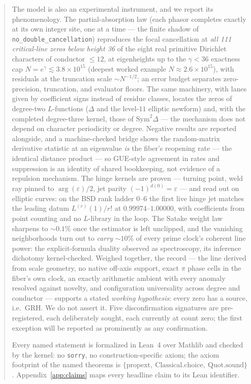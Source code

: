 \documentclass[11pt]{article}
\newcommand{\code}[1]{\texttt{#1}}
\begin{document}
\begin{abstract}
The model is also an experimental instrument, and we report its phenomenology.  The partial-absorption
law (each phasor completes exactly at its own integer site, one at a time --- the finite shadow of
\code{no\_double\_cancellation}) reproduces the focal cancellation at \emph{all 111 critical-line
zeros below height 36} of the eight real primitive Dirichlet characters of conductor $\le 12$, at
eigenheights up to the $\gamma<36$ exactness cap $N=e^{\gamma}\lesssim3.8\times10^{15}$ (deepest
worked example $N\approx2.6\times10^{15}$), with residuals at the truncation scale
$\sim N^{-1/2}$; an error budget separates zero-precision, truncation, and evaluator floors.  The
same machinery, with lanes given by coefficient signs instead of residue classes, locates the zeros
of degree-two $L$-functions ($\Delta$ and the level-$11$ elliptic newform) and, with the completed
degree-three kernel, those of $\mathrm{Sym}^2\Delta$ --- the mechanism does not
depend on character periodicity or degree.  Negative results are reported alongside, and a machine-checked bridge shows the random-matrix
derivative statistic at an eigenvalue \emph{is} the fiber's reopening rate --- the identical
distance product --- so GUE-style agreement in rates and suppression is an identity of shared
bookkeeping, not evidence of a repulsion mechanism.  The hinge kernels are proven --- turning
point, weld ray pinned to $\arg(\varepsilon)/2$, jet parity $(-1)^{d(0)}=\varepsilon$ --- and read
out on elliptic curves: on the BSD rank ladder $0$--$6$ the first live hinge jet matches the
leading datum $L^{(r)}(1)/r!$ at $0.99974$--$1.00000$, with coefficients from point counting and
no $L$-library in the loop.  The Satake weight law sharpens to ${\sim}0.1\%$ once the estimator is
left unclipped, and the vanishing neighborhoods turn out to \emph{carry} ${\sim}10\%$ of every
prime clock's coherent line power: the explicit-formula duality observed as spectroscopy, its
inference dichotomy kernel-checked.  Weighed together, the record --- the
line derived from scale geometry, no native off-axis support, exact $\pi$ phase cells in the
fiber's own clock, an exactly arithmetic ambient with every anomaly resolved against novelty,
and configuration universality across degree and conductor --- supports a stated
\emph{working hypothesis}: every zero has a source, i.e.\ GRH.  We do not assert it.
Five disconfirmation signatures are pre-registered, each deliberately sought, each currently
at count zero; the first exception will be reported as prominently as any confirmation.

Every named statement is formalized in Lean~4 over Mathlib and checked by the kernel: no
\code{sorry}, no construction-specific axiom; the axiom footprint of the named theorems is
$\{\mathrm{propext},\ \mathrm{Classical.choice},\ \mathrm{Quot.sound}\}$.  Appendix~\ref{app:claims}
maps every headline claim to its Lean identifier.
\end{abstract}
\end{document}
